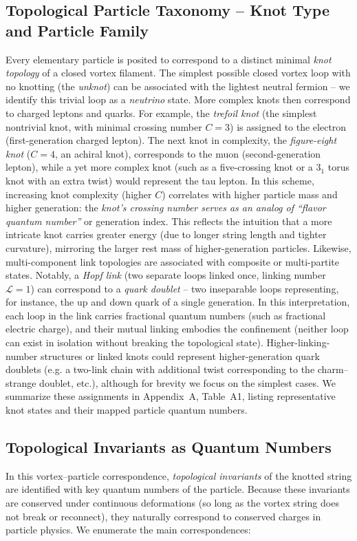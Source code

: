 \documentclass[12pt]{article}
\begin{document}
\subsection*{Topological Particle Taxonomy – Knot Type and Particle Family}
Every elementary particle is posited to correspond to a distinct minimal \emph{knot topology} of a closed vortex filament. The simplest possible closed vortex loop with no knotting (the \emph{unknot}) can be associated with the lightest neutral fermion – we identify this trivial loop as a \emph{neutrino} state. More complex knots then correspond to charged leptons and quarks. For example, the \emph{trefoil knot} (the simplest nontrivial knot, with minimal crossing number $C=3$) is assigned to the electron (first-generation charged lepton). The next knot in complexity, the \emph{figure-eight knot} ($C=4$, an achiral knot), corresponds to the muon (second-generation lepton), while a yet more complex knot (such as a five-crossing knot or a $3_1$ torus knot with an extra twist) would represent the tau lepton. In this scheme, increasing knot complexity (higher $C$) correlates with higher particle mass and higher generation: the \emph{knot’s crossing number serves as an analog of “flavor quantum number”} or generation index. This reflects the intuition that a more intricate knot carries greater energy (due to longer string length and tighter curvature), mirroring the larger rest mass of higher-generation particles\cite{arxiv2407.11731}. Likewise, multi-component link topologies are associated with composite or multi-partite states. Notably, a \emph{Hopf link} (two separate loops linked once, linking number $\mathcal{L} = 1$) can correspond to a \emph{quark doublet} – two inseparable loops representing, for instance, the up and down quark of a single generation. In this interpretation, each loop in the link carries fractional quantum numbers (such as fractional electric charge), and their mutual linking embodies the confinement (neither loop can exist in isolation without breaking the topological state). Higher-linking-number structures or linked knots could represent higher-generation quark doublets (e.g. a two-link chain with additional twist corresponding to the charm–strange doublet, etc.), although for brevity we focus on the simplest cases. We summarize these assignments in Appendix~A, Table~A1, listing representative knot states and their mapped particle quantum numbers.

\subsection*{Topological Invariants as Quantum Numbers}
In this vortex–particle correspondence, \emph{topological invariants} of the knotted string are identified with key quantum numbers of the particle. Because these invariants are conserved under continuous deformations (so long as the vortex string does not break or reconnect), they naturally correspond to conserved charges in particle physics. We enumerate the main correspondences:
\end{document}
